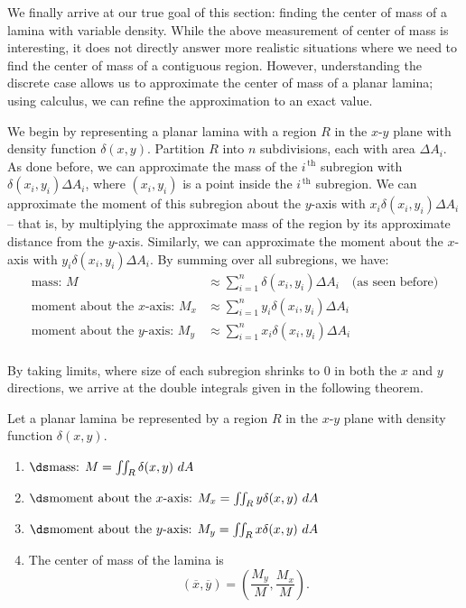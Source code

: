 We finally arrive at our true goal of this section: finding the center of mass of a lamina with variable density. While the above measurement of center of mass is interesting, it does not directly answer more realistic situations where we need to find the center of mass of a contiguous region. However, understanding the discrete case allows us to approximate the center of mass of a planar lamina; using calculus, we can refine the approximation to an exact value.

We begin by representing a planar lamina with a region $R$ in the $x$-$y$ plane with density function $\delta(x,y)$. Partition $R$ into $n$ subdivisions, each with area $\Delta A_i$. As done before, we can approximate the mass of the $i^{\,\text{th}}$ subregion with $\delta(x_i,y_i)\Delta A_i$, where $(x_i,y_i)$ is a point inside the $i^{\,\text{th}}$ subregion. We can approximate the moment of this subregion about the $y$-axis with $x_i\delta(x_i,y_i)\Delta A_i$ -- that is, by multiplying the approximate mass of the region by its approximate distance from the $y$-axis. Similarly, we can approximate the moment about the $x$-axis with $y_i\delta(x_i,y_i)\Delta A_i$. By summing over all subregions, we have:
\begin{align*}
\text{mass: } M &\approx \sum_{i=1}^n \delta(x_i,y_i)\Delta A_i\quad \text{(as seen before)}\\
\text{moment about the $x$-axis: } M_x &\approx \sum_{i=1}^n y_i\delta(x_i,y_i)\Delta A_i\\
\text{moment about the $y$-axis: } M_y &\approx \sum_{i=1}^n x_i\delta(x_i,y_i)\Delta A_i\\
\end{align*}

By taking limits, where size of each subregion shrinks to 0 in both the $x$ and $y$ directions, we arrive at the double integrals given in the following theorem.

{Let a planar lamina be represented by a region $R$ in the $x$-$y$ plane with density function $\delta(x,y)$. 
\begin{enumerate}
	\item $\ds \text{mass: } M = \iint_R\delta(x,y)\ dA$
	\item	$\ds \text{moment about the $x$-axis: } M_x = \iint_Ry\delta(x,y)\ dA$
	\item	$\ds \text{moment about the $y$-axis: } M_y = \iint_Rx\delta(x,y)\ dA$
	\item The center of mass  of the lamina is
	$$(\overline{x},\overline{y}) = \left(\frac{M_y}{M},\frac{M_x}M\right).$$
\end{enumerate}
}

